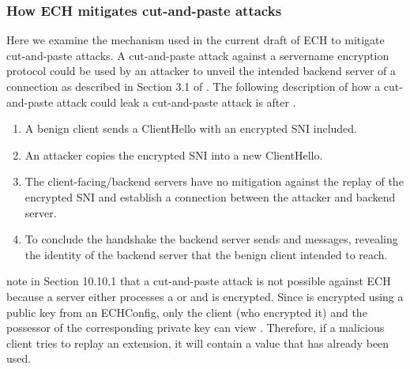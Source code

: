 \subsubsection{How ECH mitigates cut-and-paste attacks}
Here we examine the mechanism used in the current draft of ECH to mitigate cut-and-paste attacks. A cut-and-paste attack against a servername encryption protocol could be used by an attacker to unveil the intended backend server of a connection as described in Section 3.1 of \cite{rfc8744-issues}. The following description of how a cut-and-paste attack could leak a cut-and-paste attack is after \cite{rfc8744-issues}.
\begin{enumerate}
    \item A benign client sends a ClientHello with an encrypted SNI included.
    \item An attacker copies the encrypted SNI into a new ClientHello.
    \item The client-facing/backend servers have no mitigation against the replay of the encrypted SNI and establish a connection between the attacker and backend server.
    \item To conclude the handshake the backend server sends  and  messages, revealing the identity of the backend server that the benign client intended to reach. 
\end{enumerate}
\cite{esni} note in Section 10.10.1 that a cut-and-paste attack is not possible against ECH because a server either processes a  or  and  is encrypted. Since  is encrypted using a public key from an ECHConfig, only the client (who encrypted it) and the possessor of the corresponding private key can view . Therefore, if a malicious client tries to replay an  extension, it will contain a  value that has already been used.

